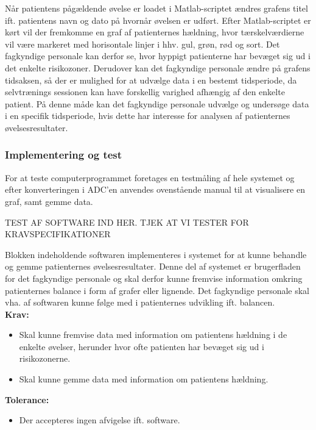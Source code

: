 Når patientens pågældende øvelse er loadet i Matlab-scriptet ændres grafens titel ift. patientens navn og dato på hvornår øvelsen er udført. Efter Matlab-scriptet er kørt vil der fremkomme en graf af patienternes hældning, hvor tærskelværdierne vil være markeret med horisontale linjer i hhv. gul, grøn, rød og sort. Det fagkyndige personale kan derfor se, hvor hyppigt patienterne har bevæget sig ud i det enkelte risikozoner. Derudover kan det fagkyndige personale ændre på grafens tidsaksen, så der er mulighed for at udvælge data i en bestemt tidsperiode, da selvtrænings sessionen kan have forskellig varighed afhængig af den enkelte patient. På denne måde kan det fagkyndige personale udvælge og undersøge data i en specifik tidsperiode, hvis dette har interesse for analysen af patienternes øvelsesresultater.  

\subsubsection{Implementering og test}
For at teste computerprogrammet foretages en testmåling af hele systemet og efter konverteringen i ADC'en anvendes ovenstående manual til at visualisere en graf, samt gemme data. 

TEST AF SOFTWARE IND HER. TJEK AT VI TESTER FOR KRAVSPECIFIKATIONER


Blokken indeholdende softwaren implementeres i systemet for at kunne behandle og gemme patienternes øvelsesresultater. Denne del af systemet er brugerfladen for det fagkyndige personale og skal derfor kunne fremvise information omkring patienternes balance i form af grafer eller lignende. Det fagkyndige personale skal vha. af softwaren kunne følge med i patienternes udvikling ift. balancen. \\
\textbf{Krav:}
\begin{itemize}
	\item Skal kunne fremvise data med information om patientens hældning i de enkelte øvelser, herunder hvor ofte patienten har bevæget sig ud i risikozonerne. 
	\item Skal kunne gemme data med information om patientens hældning.
\end{itemize}
\textbf{Tolerance:}
\begin{itemize}
	\item Der accepteres ingen afvigelse ift. software. 
\end{itemize}

